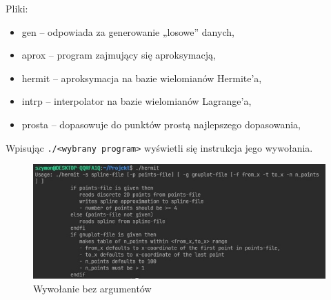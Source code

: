 \documentclass[10pt, a4paper]{report}
\begin{document}
    Pliki:
    \begin{itemize}
        \item gen – odpowiada za generowanie „losowe” danych,
        \item aprox – program zajmujący się aproksymacją,
        \item hermit – aproksymacja na bazie wielomianów Hermite’a,
        \item intrp – interpolator na bazie wielomianów Lagrange’a,
        \item prosta – dopasowuje do punktów prostą najlepszego dopasowania,
    \end{itemize}
    Wpisując \texttt{./<wybrany program>} wyświetli się instrukcja jego wywołania. 
    \begin{figure}[h]
        \begin{center}
            \includegraphics[scale=0.8]{run2.jpg}
            \caption{Wywołanie bez argumentów}
        \end{center}
    \end{figure}
    \newpage
\end{document}
